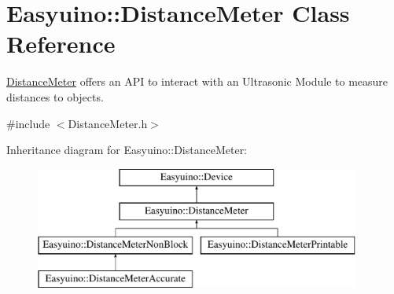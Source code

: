\hypertarget{class_easyuino_1_1_distance_meter}{}\section{Easyuino\+:\+:Distance\+Meter Class Reference}
\label{class_easyuino_1_1_distance_meter}


\hyperlink{class_easyuino_1_1_distance_meter}{Distance\+Meter} offers an A\+PI to interact with an Ultrasonic Module to measure distances to objects.  




{\ttfamily \#include $<$Distance\+Meter.\+h$>$}

Inheritance diagram for Easyuino\+:\+:Distance\+Meter\+:\begin{figure}[H]
\begin{center}
\leavevmode
\includegraphics[height=4.000000cm]{class_easyuino_1_1_distance_meter}
\end{center}
\end{figure}
